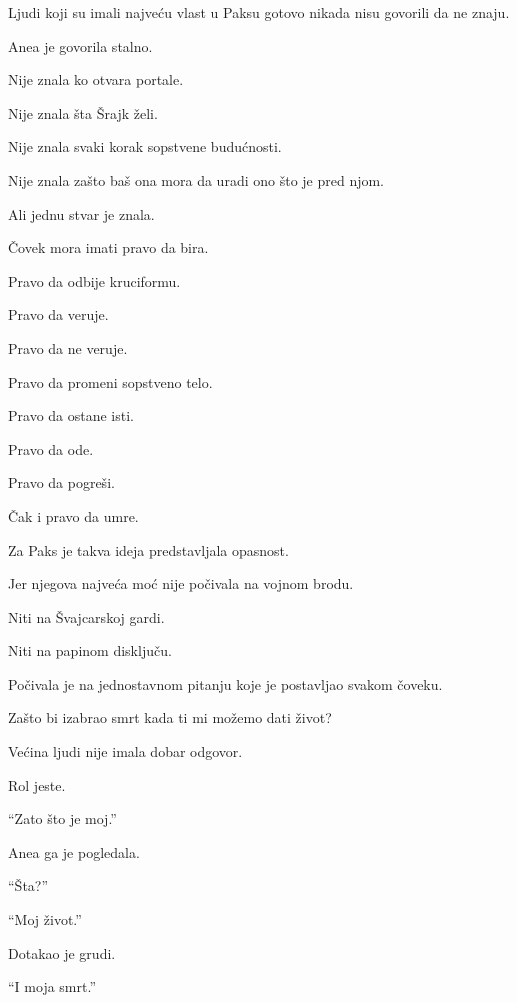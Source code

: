 Ljudi koji su imali najveću vlast u Paksu gotovo nikada nisu govorili da ne znaju.

\bigskip

Anea je govorila stalno.

\bigskip

Nije znala ko otvara portale.

Nije znala šta Šrajk želi.

Nije znala svaki korak sopstvene budućnosti.

Nije znala zašto baš ona mora da uradi ono što je pred njom.

\bigskip

Ali jednu stvar je znala.

Čovek mora imati pravo da bira.

\bigskip

Pravo da odbije kruciformu.

Pravo da veruje.

Pravo da ne veruje.

Pravo da promeni sopstveno telo.

Pravo da ostane isti.

Pravo da ode.

Pravo da pogreši.

Čak i pravo da umre.

\bigskip

Za Paks je takva ideja predstavljala opasnost.

Jer njegova najveća moć nije počivala na vojnom brodu.

Niti na Švajcarskoj gardi.

Niti na papinom disključu.

\bigskip

Počivala je na jednostavnom pitanju koje je postavljao svakom čoveku.

Zašto bi izabrao smrt kada ti mi možemo dati život?

\bigskip

Većina ljudi nije imala dobar odgovor.

\bigskip

Rol jeste.

``Zato što je moj.''

\bigskip

Anea ga je pogledala.

``Šta?''

``Moj život.''

Dotakao je grudi.

``I moja smrt.''

